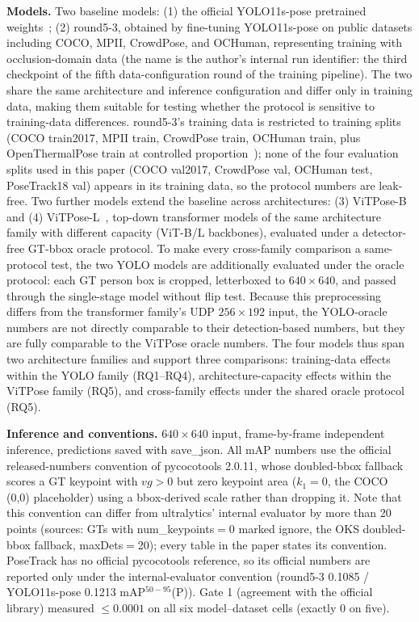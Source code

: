 \documentclass[10pt,conference]{IEEEtran}
\begin{document}
\textbf{Models.} Two baseline models: (1) the official YOLO11s-pose pretrained weights~\cite{14}; (2) round5-3, obtained by fine-tuning YOLO11s-pose on public datasets including COCO, MPII, CrowdPose, and OCHuman, representing training with occlusion-domain data (the name is the author's internal run identifier: the third checkpoint of the fifth data-configuration round of the training pipeline). The two share the same architecture and inference configuration and differ only in training data, making them suitable for testing whether the protocol is sensitive to training-data differences. round5-3's training data is restricted to training splits (COCO train2017, MPII train, CrowdPose train, OCHuman train, plus OpenThermalPose train at controlled proportion~\cite{18}); none of the four evaluation splits used in this paper (COCO val2017, CrowdPose val, OCHuman test, PoseTrack18 val) appears in its training data, so the protocol numbers are leak-free. Two further models extend the baseline across architectures: (3) ViTPose-B and (4) ViTPose-L~\cite{17}, top-down transformer models of the same architecture family with different capacity (ViT-B/L backbones), evaluated under a detector-free GT-bbox oracle protocol. To make every cross-family comparison a same-protocol test, the two YOLO models are additionally evaluated under the oracle protocol: each GT person box is cropped, letterboxed to $640\times640$, and passed through the single-stage model without flip test. Because this preprocessing differs from the transformer family's UDP $256\times192$ input, the YOLO-oracle numbers are not directly comparable to their detection-based numbers, but they are fully comparable to the ViTPose oracle numbers. The four models thus span two architecture families and support three comparisons: training-data effects within the YOLO family (RQ1--RQ4), architecture-capacity effects within the ViTPose family (RQ5), and cross-family effects under the shared oracle protocol (RQ5).

\textbf{Inference and conventions.} $640\times640$ input, frame-by-frame independent inference, predictions saved with save\_json. All mAP numbers use the official released-numbers convention of pycocotools 2.0.11, whose doubled-bbox fallback scores a GT keypoint with $vg>0$ but zero keypoint area ($k_1=0$, the COCO (0,0) placeholder) using a bbox-derived scale rather than dropping it. Note that this convention can differ from ultralytics' internal evaluator by more than 20 points (sources: GTs with num\_keypoints$=$0 marked ignore, the OKS doubled-bbox fallback, maxDets$=$20); every table in the paper states its convention. PoseTrack has no official pycocotools reference, so its official numbers are reported only under the internal-evaluator convention (round5-3 0.1085 / YOLO11s-pose 0.1213 mAP$^{50-95}$(P)). Gate 1 (agreement with the official library) measured $\le 0.0001$ on all six model--dataset cells (exactly 0 on five).
\end{document}

